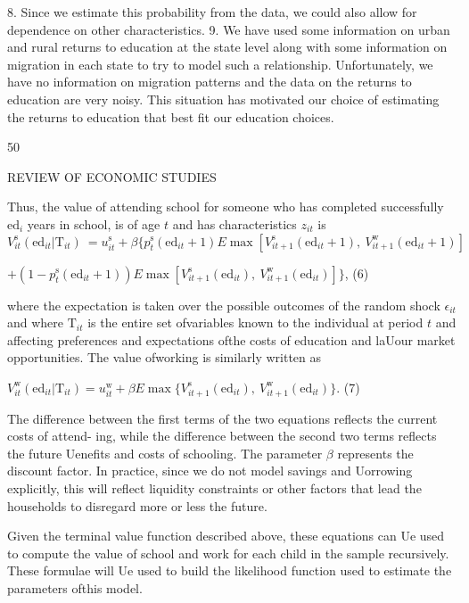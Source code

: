 8. Since we estimate this probability from the data, we could also allow for dependence on other characteristics. 9. We have used some information on urban and rural returns to education at the state level along with some information on migration in each state to try to model such a relationship. Unfortunately, we have no information on migration patterns and the data on the returns to education are very noisy. This situation has motivated our choice of estimating the returns to education that best fit our education choices.

50

REVIEW OF ECONOMIC STUDIES

Thus, the value of attending school for someone who has completed successfully $\mathrm{e}\mathrm{d}_{i}$ years in school, is of age $t$ and has characteristics $z_{it}$ is
$$
V_{it}^{\mathrm{s}}(\mathrm{e}\mathrm{d}_{it}|\mathrm{T}_{it})\ =u_{it}^{\mathrm{s}}+\beta\{p_{t}^{\mathrm{s}}(\mathrm{e}\mathrm{d}_{it}+1)E\max[V_{it+1}^{\mathrm{s}}(\mathrm{e}\mathrm{d}_{it}+1),\ V_{it+1}^{\mathrm{w}}(\mathrm{e}\mathrm{d}_{it}+1)]
$$
\begin{center}
$+(1-p_{t}^{\mathrm{s}}(\displaystyle \mathrm{e}\mathrm{d}_{it}+1))E\max[V_{it+1}^{\mathrm{s}}(\mathrm{e}\mathrm{d}_{it}),\ V_{it+1}^{\mathrm{w}}(\mathrm{e}\mathrm{d}_{it})]\}$,   (6)
\end{center}
where the expectation is taken over the possible outcomes of the random shock $\epsilon_{it}$ and where $\mathrm{T}_{it}$ is the entire set ofvariables known to the individual at period $t$ and affecting preferences and expectations ofthe costs of education and laUour market opportunities. The value ofworking is similarly written as
\begin{center}
$V_{it}^{\mathrm{w}}(\displaystyle \mathrm{e}\mathrm{d}_{it}|\mathrm{T}_{it})=u_{it}^{\mathrm{w}}+\beta E\max\{V_{it+1}^{\mathrm{s}}(\mathrm{e}\mathrm{d}_{it}),\ V_{it+1}^{\mathrm{w}}(\mathrm{e}\mathrm{d}_{it})\}$.   (7)
\end{center}
The difference between the first terms of the two equations reflects the current costs of attend- ing, while the difference between the second two terms reflects the future Uenefits and costs of schooling. The parameter $\beta$ represents the discount factor. In practice, since we do not model savings and Uorrowing explicitly, this will reflect liquidity constraints or other factors that lead the households to disregard more or less the future.

Given the terminal value function described above, these equations can Ue used to compute the value of school and work for each child in the sample recursively. These formulae will Ue used to build the likelihood function used to estimate the parameters ofthis model.

